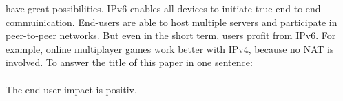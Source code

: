 \documentclass[format=sigconf, natbib=true, nonacm=true]{acmart}
\begin{document}
have great possibilities. IPv6 enables all devices to initiate true end-to-end commuinication. End-users are able to host multiple servers and participate in peer-to-peer networks. But even in the short term, users profit from IPv6. For example, online multiplayer games work better with IPv4, because no NAT is involved. To answer the title of this paper in one sentence:\\\\The end-user impact is positiv.

    
    
\end{document}
